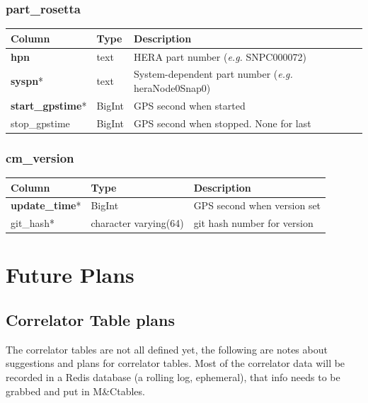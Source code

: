 \documentclass{article}
\newcommand{\mc}{M\&C}
\begin{document}
{\subsubsection{part\_rosetta}
\begin{center}
\begin{tabular}{| p{4cm} | p{2cm} | p{10cm} |}
\hline
{\bf Column} & {\bf Type} & {\bf Description} \\ \hline
{\bf hpn} & text & HERA part number ({\em e.g.} SNPC000072) \\ \hline
{\bf syspn}* & text & System-dependent part number ({\em e.g.} heraNode0Snap0) \\ \hline
{\bf start\_gpstime}* & BigInt & GPS second when started \\ \hline
stop\_gpstime & BigInt & GPS second when stopped.  None for last \\ \hline
\end{tabular}
\end{center}

\subsubsection{cm\_version}
\begin{center}
\begin{tabular}{| p{4cm} | p{2cm} | p{10cm} |}
\hline
{\bf Column} & {\bf Type} & {\bf Description} \\ \hline
{\bf update\_time}* & BigInt & GPS second when version set \\ \hline
git\_hash* & character varying(64) & git hash number for version \\ \hline
\end{tabular}
\end{center}


\section{Future Plans}
\label{sec:future}
\subsection{Correlator Table plans}
\label{sec:corr_future}
The correlator tables are not all defined yet, the following are notes about suggestions and plans for correlator tables. Most of the correlator data will be recorded in a Redis database (a rolling log, ephemeral), that info needs to be grabbed and put in \mc tables.

}
\end{document}
